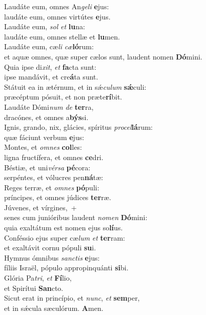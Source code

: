 \evenverse Laudáte eum, omnes An\textit{ge}\textit{li} \textbf{e}jus:~\*\\
\evenverse laudáte eum, omnes virtútes \textbf{e}jus.\\
\oddverse Laudáte eum, \textit{sol} \textit{et} \textbf{lu}na:~\*\\
\oddverse laudáte eum, omnes stellæ et \textbf{lu}men.\\
\evenverse Laudáte eum, cæ\textit{li} \textit{cæ}\textbf{ló}rum:~\*\\
\evenverse et aquæ omnes, quæ super cælos sunt, laudent nomen \textbf{Dó}mini.\\
\oddverse Quia ipse di\textit{xit}, \textit{et} \textbf{fa}cta sunt:~\*\\
\oddverse ipse mandávit, et cre\textbf{á}ta sunt.\\
\evenverse Státuit ea in ætérnum, et in sǽ\textit{cu}\textit{lum} \textbf{sǽ}culi:~\*\\
\evenverse præcéptum pósuit, et non præte\textbf{rí}bit.\\
\oddverse Laudáte Dómi\textit{num} \textit{de} \textbf{ter}ra,~\*\\
\oddverse dracónes, et omnes a\textbf{býs}si.\\
\evenverse Ignis, grando, nix, glácies, spíritus \textit{pro}\textit{cel}\textbf{lá}rum:~\*\\
\evenverse quæ fáciunt verbum \textbf{e}jus:\\
\oddverse Montes, et \textit{om}\textit{nes} \textbf{col}les:~\*\\
\oddverse ligna fructífera, et omnes \textbf{ce}dri.\\
\evenverse Béstiæ, et uni\textit{vér}\textit{sa} \textbf{pé}cora:~\*\\
\evenverse serpéntes, et vólucres pen\textbf{ná}tæ:\\
\oddverse Reges terræ, et \textit{om}\textit{nes} \textbf{pó}puli:~\*\\
\oddverse príncipes, et omnes júdices \textbf{ter}ræ.\\
\evenverse Júvenes, et vírgines,~+\\
\evenverse  senes cum junióribus laudent \textit{no}\textit{men} \textbf{Dó}mini:~\*\\
\evenverse quia exaltátum est nomen ejus so\textbf{lí}us.\\
\oddverse Conféssio ejus super cæ\textit{lum} \textit{et} \textbf{ter}ram:~\*\\
\oddverse et exaltávit cornu pópuli \textbf{su}i.\\
\evenverse Hymnus ómnibus \textit{san}\textit{ctis} \textbf{e}jus:~\*\\
\evenverse fíliis Israël, pópulo appropinquánti \textbf{si}bi.\\
\oddverse Glória Pa\textit{tri}, \textit{et} \textbf{Fí}lio,~\*\\
\oddverse et Spirítui \textbf{San}cto.\\
\evenverse Sicut erat in princípio, et \textit{nunc}, \textit{et} \textbf{sem}per,~\*\\
\evenverse et in sǽcula sæculórum. \textbf{A}men.\\
